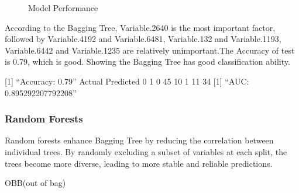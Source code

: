 \documentclass[
  12pt,
  letterpaper,
  DIV=11,
  numbers=noendperiod]{scrartcl}
\begin{document}
\begin{figure}


\caption{\label{fig-tree5}Model Performance}

\end{figure}%

According to the Bagging Tree, Variable.2640 is the most important
factor, followed by Variable.4192 and Variable.6481, Variable.132 and
Variable.1193, Variable.6442 and Variable.1235 are relatively
unimportant.The Accuracy of test is 0.79, which is good. Showing the
Bagging Tree has good classification ability.

{[}1{]} ``Accuracy: 0.79'' Actual Predicted 0 1 0 45 10 1 11 34 {[}1{]}
``AUC: 0.895292207792208''

\subsubsection{Random Forests}\label{random-forests}

Random forests enhance Bagging Tree by reducing the correlation between
individual trees. By randomly excluding a subset of variables at each
split, the trees become more diverse, leading to more stable and
reliable predictions.

OBB(out of bag)
\end{document}

